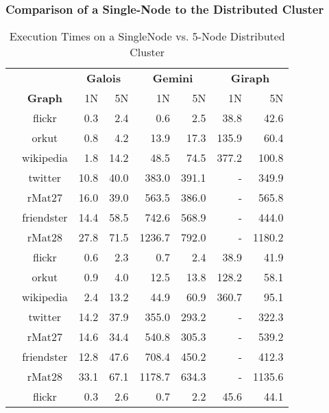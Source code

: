





\subsubsection{Comparison of a Single-Node to the Distributed Cluster}
\begin{table}
	\caption{Execution Times on a SingleNode vs. 5-Node Distributed Cluster}
	\label{tbl:execTimeComparison}
	\renewcommand{\arraystretch}{1.2}
	\centering
	\begin{tabular}{ccr@{\tabskip 1 \tabcolsep}r
	r@{\tabskip 1 \tabcolsep}r
	r@{\tabskip 1 \tabcolsep}r}
		\toprule
		&&\multicolumn{2}{c}{\bf Galois}&\multicolumn{2}{c}{\bf Gemini}&\multicolumn{2}{c}{\bf Giraph}\\
		\cmidrule{3-4}\cmidrule{5-6}\cmidrule{7-8}
		&\bf Graph&1N&5N&1N&5N&1N&5N\\
		\midrule
		\multirow{7}{0.5ex}{\rotatebox{90}{\bf SSSP}}&flickr & 0.3 & 2.4 & 0.6 & 2.5 & 38.8 & 42.6 \\
		& orkut & 0.8 & 4.2 & 13.9 & 17.3 & 135.9 & 60.4 \\
		& wikipedia & 1.8 & 14.2 & 48.5 & 74.5 & 377.2 & 100.8 \\
		& twitter & 10.8 & 40.0 & 383.0 & 391.1 & - & 349.9 \\
		& rMat27 & 16.0 & 39.0 & 563.5 & 386.0 & - & 565.8 \\
		& friendster & 14.4 & 58.5 & 742.6 & 568.9 & - & 444.0 \\
		& rMat28 & 27.8 & 71.5 & 1236.7 & 792.0 & - & 1180.2 \\
		\midrule
		\multirow{7}{0.5ex}{\rotatebox{90}{\bf BFS}}& flickr & 0.6 & 2.3 & 0.7 & 2.4 & 38.9 & 41.9 \\
		& orkut & 0.9 & 4.0 & 12.5 & 13.8 & 128.2 & 58.1 \\
		& wikipedia & 2.4 & 13.2 & 44.9 & 60.9 & 360.7 & 95.1 \\
		& twitter & 14.2 & 37.9 & 355.0 & 293.2 & - & 322.3 \\
		& rMat27 & 14.6 & 34.4 & 540.8 & 305.3 & - & 539.2 \\
		& friendster & 12.8 & 47.6 & 708.4 & 450.2 & - & 412.3 \\
		& rMat28 & 33.1 & 67.1 & 1178.7 & 634.3 & - & 1135.6 \\
		\midrule
		\multirow{7}{0.5ex}{\rotatebox{90}{\bf PR}}& flickr & 0.3\txtdagger & 2.6 & 0.7 & 2.2 & 45.6 & 44.1 \\

\end{tabular}
\end{table}
